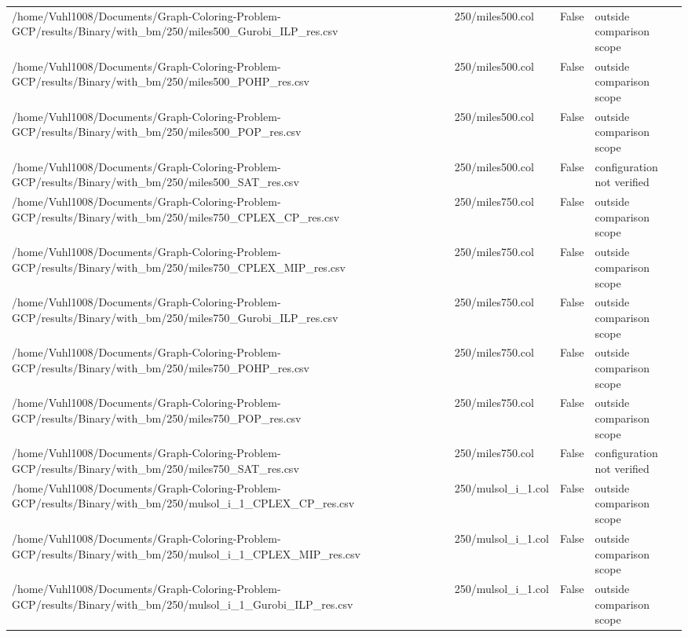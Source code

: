 \begin{table}[htbp]
\begin{tabular}{llll}
/home/Vuhl1008/Documents/Graph-Coloring-Problem-GCP/results/Binary/with\_bm/250/miles500\_Gurobi\_ILP\_res.csv & 250/miles500.col & False & outside comparison scope \\
/home/Vuhl1008/Documents/Graph-Coloring-Problem-GCP/results/Binary/with\_bm/250/miles500\_POHP\_res.csv & 250/miles500.col & False & outside comparison scope \\
/home/Vuhl1008/Documents/Graph-Coloring-Problem-GCP/results/Binary/with\_bm/250/miles500\_POP\_res.csv & 250/miles500.col & False & outside comparison scope \\
/home/Vuhl1008/Documents/Graph-Coloring-Problem-GCP/results/Binary/with\_bm/250/miles500\_SAT\_res.csv & 250/miles500.col & False & configuration not verified \\
/home/Vuhl1008/Documents/Graph-Coloring-Problem-GCP/results/Binary/with\_bm/250/miles750\_CPLEX\_CP\_res.csv & 250/miles750.col & False & outside comparison scope \\
/home/Vuhl1008/Documents/Graph-Coloring-Problem-GCP/results/Binary/with\_bm/250/miles750\_CPLEX\_MIP\_res.csv & 250/miles750.col & False & outside comparison scope \\
/home/Vuhl1008/Documents/Graph-Coloring-Problem-GCP/results/Binary/with\_bm/250/miles750\_Gurobi\_ILP\_res.csv & 250/miles750.col & False & outside comparison scope \\
/home/Vuhl1008/Documents/Graph-Coloring-Problem-GCP/results/Binary/with\_bm/250/miles750\_POHP\_res.csv & 250/miles750.col & False & outside comparison scope \\
/home/Vuhl1008/Documents/Graph-Coloring-Problem-GCP/results/Binary/with\_bm/250/miles750\_POP\_res.csv & 250/miles750.col & False & outside comparison scope \\
/home/Vuhl1008/Documents/Graph-Coloring-Problem-GCP/results/Binary/with\_bm/250/miles750\_SAT\_res.csv & 250/miles750.col & False & configuration not verified \\
/home/Vuhl1008/Documents/Graph-Coloring-Problem-GCP/results/Binary/with\_bm/250/mulsol\_i\_1\_CPLEX\_CP\_res.csv & 250/mulsol\_i\_1.col & False & outside comparison scope \\
/home/Vuhl1008/Documents/Graph-Coloring-Problem-GCP/results/Binary/with\_bm/250/mulsol\_i\_1\_CPLEX\_MIP\_res.csv & 250/mulsol\_i\_1.col & False & outside comparison scope \\
/home/Vuhl1008/Documents/Graph-Coloring-Problem-GCP/results/Binary/with\_bm/250/mulsol\_i\_1\_Gurobi\_ILP\_res.csv & 250/mulsol\_i\_1.col & False & outside comparison scope \\

\end{tabular}
\end{table}
